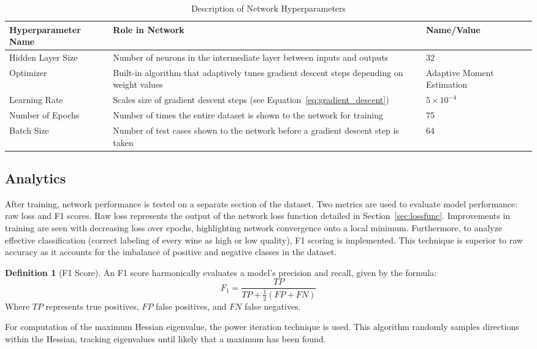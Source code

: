 \documentclass{article}
\theoremstyle{definition}
\newtheorem{definition}{Definition}[section]
\begin{document}
\begin{table}[H]
    \centering
    \begin{tabularx}{\textwidth}{|X|X|X|}\hline
         Hyperparameter Name&  Role in Network& Name/Value\\\hline
         Hidden Layer Size&  Number of neurons in the intermediate layer between inputs and outputs& 32\\\hline
         Optimizer& Built-in algorithm that adaptively tunes gradient descent steps depending on weight values& Adaptive Moment Estimation\\\hline
         Learning Rate&  Scales size of gradient descent steps (see Equation~\ref{eq:gradient_descent}) & $5 \times 10^{-4}$\\\hline
         Number of Epochs & Number of times the entire dataset is shown to the network for training & 75 \\\hline
         Batch Size & Number of test cases shown to the network before a gradient descent step is taken & 64 \\\hline
    \end{tabularx}
    \caption{Description of Network Hyperparameters}
    \label{tab:Table 1}
\end{table}
\subsection{Analytics}
\label{sec:analytics}
After training, network performance is tested on a separate section of the dataset. Two metrics are used to evaluate model performance: raw loss and F1 scores. Raw loss represents the output of the network loss function detailed in Section~\ref{sec:lossfunc}. Improvements in training are seen with decreasing loss over epochs, highlighting network convergence onto a local minimum. Furthermore, to analyze effective classification (correct labeling of every wine as high or low quality), F1 scoring is implemented. This technique is superior to raw accuracy as it accounts for the imbalance of positive and negative classes in the dataset.

\begin{definition}[F1 Score]
    An F1 score harmonically evaluates a model's precision and recall, given by the formula:
    \[
        F_1 = \frac{TP}{TP + \frac{1}{2} (FP + FN)}
    \]
    Where $TP$ represents true positives, $FP$ false positives, and $FN$ false negatives.
\end{definition}

For computation of the maximum Hessian eigenvalue, the power iteration technique is used. This algorithm randomly samples directions within the Hessian, tracking eigenvalues until likely that a maximum has been found.
\end{document}
